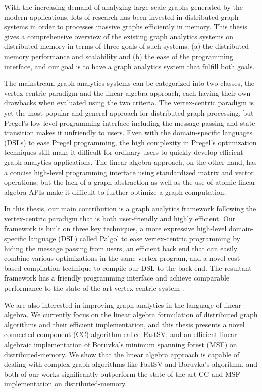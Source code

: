 \documentclass{sokendai_thesis} %
\begin{document}
With the increasing demand of analyzing large-scale graphs generated by the modern applications, lots of research has been invested in distributed graph systems in order to processes massive graphs efficiently in memory.
This thesis gives a comprehensive overview of the existing graph analytics systems on distributed-memory in terms of three goals of such systems: (a) the distributed-memory performance and scalability and (b) the ease of the programming interface, and our goal is to have a graph analytics system that fulfill both goals.


The mainstream graph analytics systems can be categorized into two classes, the vertex-centric paradigm and the linear algebra approach, each having their own drawbacks when evaluated using the two criteria.
The vertex-centric paradigm is yet the most popular and general approach for distributed graph processing, but Pregel's low-level programming interface including the message passing and state transition makes it unfriendly to users.
Even with the domain-specific languages (DSLs) to ease Pregel programming, the high complexity in Pregel's optimization techniques still make it difficult for ordinary users to quickly develop efficient graph analytics applications.
The linear algebra approach, on the other hand, has a concise high-level programming interface using standardized matrix and vector operations, but the lack of a graph abstraction as well as the use of atomic linear algebra APIs make it difficult to further optimize a graph computation.


In this thesis, our main contribution is a graph analytics framework following the vertex-centric paradigm that is both user-friendly and highly efficient.
Our framework is built on three key techniques, a more expressive high-level domain-specific language (DSL) called Palgol to ease vertex-centric programming by hiding the message passing from users, an efficient back end that can easily combine various optimizations in the same vertex-program, and a novel cost-based compilation technique to compile our DSL to the back end.
The resultant framework has a friendly programming interface and achieve comparable performance to the state-of-the-art vertex-centric system .

We are also interested in improving graph analytics in the language of linear algebra.
We currently focus on the linear algebra formulation of distributed graph algorithms and their efficient implementation, and this thesis presents a novel connected component (CC) algorithm called FastSV, and an efficient linear algebraic implementation of Boruvka's minimum spanning forest (MSF) on distributed-memory.
We show that the linear algebra approach is capable of dealing with complex graph algorithms like FastSV and Boruvka's algorithm, and both of our works significantly outperform the state-of-the-art CC and MSF implementation on distributed-memory.
\end{document}
